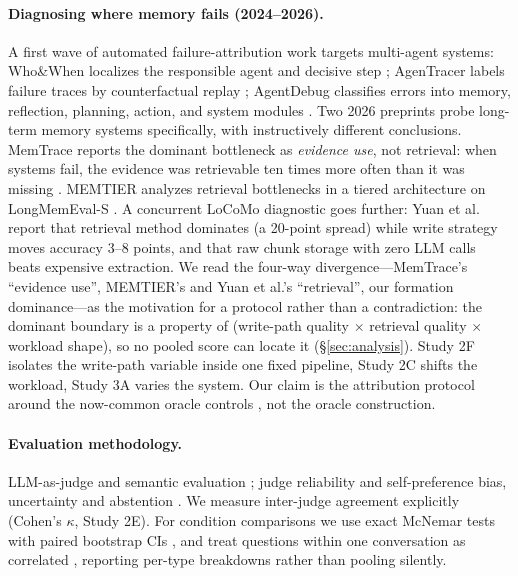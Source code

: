 \documentclass[11pt]{article}
\begin{document}
\paragraph{Diagnosing where memory fails (2024--2026).} A first wave of
automated failure-attribution work targets multi-agent systems: Who\&When
localizes the responsible agent and decisive step \cite{whowhen};
AgenTracer labels failure traces by counterfactual replay \cite{agentracer};
AgentDebug classifies errors into memory, reflection, planning, action,
and system modules \cite{agentdebug}. Two 2026 preprints probe long-term
memory systems specifically, with instructively different conclusions.
MemTrace reports the dominant bottleneck as \emph{evidence use}, not
retrieval: when systems fail, the evidence was retrievable ten times more
often than it was missing \cite{memtrace}. MEMTIER analyzes retrieval
bottlenecks in a tiered architecture on LongMemEval-S \cite{memtier}. A
concurrent LoCoMo diagnostic goes further: Yuan et al.~\cite{memory-probe}
report that retrieval method dominates (a 20-point spread) while write
strategy moves accuracy 3--8 points, and that raw chunk storage with zero
LLM calls beats expensive extraction. We read the four-way
divergence---MemTrace's ``evidence use'', MEMTIER's and Yuan et al.'s
``retrieval'', our formation dominance---as the motivation for a protocol
rather than a contradiction: the dominant boundary is a property of
(write-path quality $\times$ retrieval quality $\times$ workload shape),
so no pooled score can locate it (\S\ref{sec:analysis}). Study 2F isolates
the write-path variable inside one fixed pipeline, Study 2C shifts the
workload, Study 3A varies the system. Our claim is the attribution
protocol around the now-common oracle controls
\cite{memtrace,memtier,memory-probe}, not the oracle construction.

\paragraph{Evaluation methodology.} LLM-as-judge and semantic evaluation
\cite{llm-as-judge,g-eval}; judge reliability and self-preference bias,
uncertainty and abstention \cite{metamemory}. We measure inter-judge
agreement explicitly (Cohen's $\kappa$, Study 2E). For condition
comparisons we use exact McNemar tests \cite{exact-mcnemar} with paired
bootstrap CIs \cite{efron-bootstrap}, and treat questions within one
conversation as correlated \cite{dietterich-nested}, reporting per-type
breakdowns rather than pooling silently.
\end{document}

